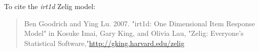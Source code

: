To cite the \emph{ irt1d } Zelig model:
 \begin{verse}
 Ben Goodrich and Ying Lu. 2007. "irt1d: One Dimensional Item Response Model" in Kosuke Imai, Gary King, and Olivia Lau, "Zelig: Everyone's Statistical Software,"\url{http://gking.harvard.edu/zelig} 
\end{verse}